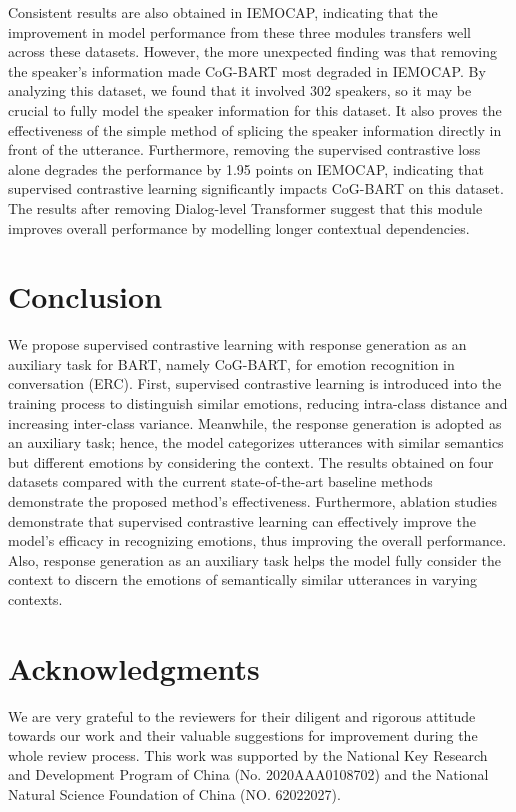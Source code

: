 \documentclass[letterpaper]{article} \usepackage{aaai22}  \usepackage{times}  \usepackage{helvet}  \usepackage{courier}  \usepackage[hyphens]{url}  \usepackage{graphicx} \urlstyle{rm} \def\UrlFont{\rm}  \usepackage{natbib}  \usepackage{caption} \DeclareCaptionStyle{ruled}{labelfont=normalfont,labelsep=colon,strut=off} \frenchspacing  \setlength{\pdfpagewidth}{8.5in}  \setlength{\pdfpageheight}{11in}  \usepackage{algorithm}
\begin{document}
Consistent results are also obtained in IEMOCAP, indicating that the improvement in model performance from these three modules transfers well across these datasets. However, the more unexpected finding was that removing the speaker's information made CoG-BART most degraded in IEMOCAP. By analyzing this  dataset, we found that it involved 302 speakers, so it may be crucial to fully model the speaker information for this dataset. It also proves the effectiveness of the simple method of splicing the speaker information directly in front of the utterance. Furthermore, removing the supervised contrastive loss alone degrades the performance by 1.95 points on IEMOCAP, indicating that supervised contrastive learning significantly impacts CoG-BART on this dataset. The results after removing Dialog-level Transformer suggest that this module improves overall performance by modelling longer contextual dependencies.


\section{Conclusion}
We propose supervised contrastive learning with response generation as an auxiliary task for BART, namely CoG-BART, for emotion recognition in conversation (ERC). First, supervised contrastive learning is introduced into the training process to distinguish similar emotions, reducing intra-class distance and increasing inter-class variance. Meanwhile, the response generation is adopted as an auxiliary task; hence, the model categorizes utterances with similar semantics but different emotions by considering the context. The results obtained on four datasets compared with the current state-of-the-art baseline methods demonstrate the proposed method's effectiveness. Furthermore, ablation studies demonstrate that supervised contrastive learning can effectively improve the model's efficacy in recognizing emotions, thus improving the overall performance. Also, response generation as an auxiliary task helps the model fully consider the context to discern the emotions of semantically similar utterances in varying contexts.


\section{Acknowledgments}
We are very grateful to the reviewers for their diligent and rigorous attitude towards our work and their valuable suggestions for improvement during the whole review process. This work was supported by the National Key Research and Development Program of China (No. 2020AAA0108702) and the National Natural Science Foundation of China (NO. 62022027).





\end{document}
